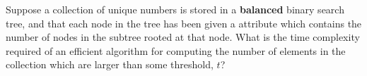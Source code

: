 \begin{prob}
    Suppose a collection of unique numbers is stored in a \textbf{balanced}
    binary search tree, and that each node in the tree has been given a
     attribute which contains the number of nodes in the subtree
    rooted at that node. What is the time complexity required of an efficient
    algorithm for computing the number of elements in the collection which are
    larger than some threshold, $t$?


\end{prob}
